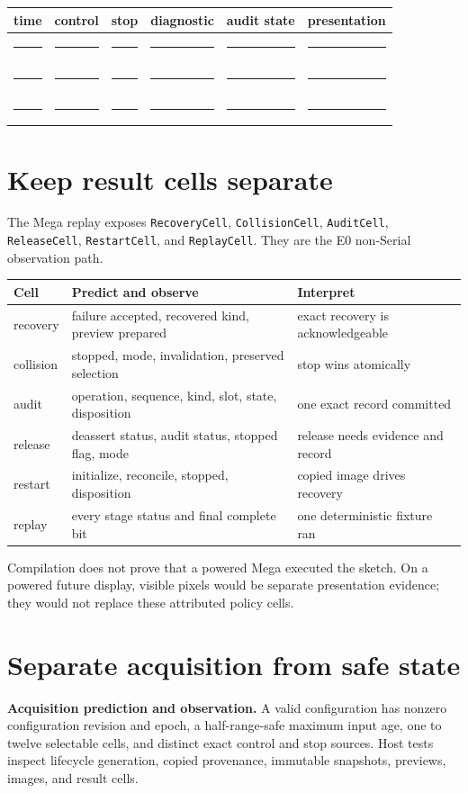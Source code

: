 \documentclass[10pt]{article}
\newcommand{\blankline}{\rule{0.72in}{0.4pt}}
\begin{document}
\begin{tabularx}{\linewidth}{@{}X X X X X X@{}}
\toprule
time & control & stop & diagnostic & audit state & presentation\\
\midrule
\rule{0pt}{16pt}\blankline & \blankline & \blankline & \blankline & \blankline & \blankline\\[8pt]
\blankline & \blankline & \blankline & \blankline & \blankline & \blankline\\[8pt]
\blankline & \blankline & \blankline & \blankline & \blankline & \blankline\\
\bottomrule
\end{tabularx}

\section{Keep result cells separate}
The Mega replay exposes \texttt{RecoveryCell}, \texttt{CollisionCell},
\texttt{AuditCell}, \texttt{ReleaseCell}, \texttt{RestartCell}, and
\texttt{ReplayCell}. They are the E0 non-Serial observation path.

\begin{tabularx}{\linewidth}{@{}l X X@{}}
\toprule
Cell & Predict and observe & Interpret\\
\midrule
recovery & failure accepted, recovered kind, preview prepared & exact recovery is acknowledgeable\\
collision & stopped, mode, invalidation, preserved selection & stop wins atomically\\
audit & operation, sequence, kind, slot, state, disposition & one exact record committed\\
release & deassert status, audit status, stopped flag, mode & release needs evidence and record\\
restart & initialize, reconcile, stopped, disposition & copied image drives recovery\\
replay & every stage status and final complete bit & one deterministic fixture ran\\
\bottomrule
\end{tabularx}

Compilation does not prove that a powered Mega executed the sketch. On a
powered future display, visible pixels would be separate presentation
evidence; they would not replace these attributed policy cells.

\section{Separate acquisition from safe state}
\textbf{Acquisition prediction and observation.} A valid configuration has
nonzero configuration revision and epoch, a half-range-safe maximum input age,
one to twelve selectable cells, and distinct exact control and stop sources.
Host tests inspect lifecycle generation, copied provenance, immutable
snapshots, previews, images, and result cells.
\end{document}
